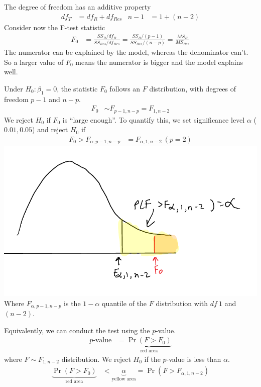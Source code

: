 \documentclass[12 pt]{article}
\begin{document}
  The degree of freedom has an additive property
  \begin{align*}
    df_T & = df_R + df_{Res} & n - 1 & = 1 + (n-2)
  \end{align*}
  Consider now the F-test statistic
  \begin{align*}
    F_0 & = \frac{SS_R/df_R}{SS_{Res}/df_{Res}} = \frac{SS_R/(p-1)}{SS_{Res}/(n-p)} = \frac{MS_R}{MS_{Res}}
  \end{align*}
  The numerator can be explained by the model, whereas the denominator
  can't. So a larger value of $F_0$ means the numerator is bigger and
  the model explains well.

  Under $H_0: \beta_1 = 0$, the statistic $F_0$ follows an $F$
  distribution, with degrees of freedom $p - 1$ and $n - p$.
  \begin{align*}
    F_0 & \sim F_{p-1, n - p} = F_{1,n - 2}
  \end{align*}
  We reject $H_0$ if $F_0$ is ``large enough''. To quantify this, we
  set significance level $\alpha$ ($0.01, 0.05$) and reject $H_0$ if
  \begin{align*}
    F_0 > F_{\alpha, p-1, n-p} & = F_{\alpha, 1, n-2}\ (p = 2)
  \end{align*}
  \includegraphics[width=.6\textwidth]{22.pdf}
  \\ Where $F_{\alpha, p-1, n-p}$ is the $1-\alpha$ quantile of the
  $F$ distribution with $df\ 1$ and $(n-2)$.

  Equivalently, we can conduct the test using the $p$-value.
  \begin{align*}
    p \text{-value} & = \underbrace{\Pr(F > F_0)}_{\text{red area}}
  \end{align*}
  where $F \sim F_{1, n-2}$ distribution. We reject $H_0$ if the
  $p$-value is less than $\alpha$.
  \begin{align*}
    \underbrace{\Pr(F > F_0)}_{\text{red area}} & <
                                             \underbrace{\alpha}_{\text{yellow
                                                  area}}
                                                  = \Pr(F > F_{\alpha, 1, n-2})
  \end{align*}
\end{document}
